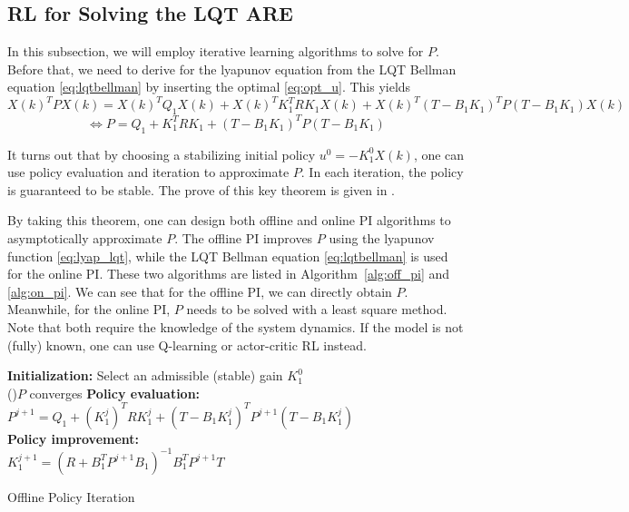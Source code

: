 \subsection{\ac{RL} for Solving the LQT ARE}
In this subsection, we will employ iterative learning algorithms to solve for $P$. Before that, we need to derive for the lyapunov equation from the LQT Bellman equation \eqref{eq:lqtbellman} by inserting the optimal \eqref{eq:opt_u}. This yields
\begin{equation*}
X(k)^TPX(k) =  X(k)^TQ_1X(k) + X(k)^TK_1^TRK_1X(k) + X(k)^T(T - B_1K_1)^TP(T - B_1K_1)X(k)
\end{equation*}
\begin{equation}
\label{eq:lyap_lqt}
\Leftrightarrow  P =  Q_1 + K_1^TRK_1 + (T - B_1K_1)^TP(T - B_1K_1)
\end{equation}

It turns out that by choosing a stabilizing initial policy $u^0 = -K_1^0X(k)$, one can use policy evaluation and iteration to approximate $ P $. In each iteration, the policy is guaranteed to be stable. The prove of this key theorem is given in \cite{1099755}. 

By taking this theorem, one can design both offline and online \ac{PI} algorithms to asymptotically approximate $P$. The offline \ac{PI} improves $P$ using the lyapunov function \eqref{eq:lyap_lqt}, while the LQT Bellman equation \eqref{eq:lqtbellman} is used for the online \ac{PI}. These two algorithms are listed in Algorithm~\ref{alg:off_pi} and \ref{alg:on_pi}. We can see that for the offline \ac{PI}, we can directly obtain $P$. Meanwhile, for the online \ac{PI}, $P$ needs to be solved with a least square method. Note that both require the knowledge of the system dynamics. If the model is not (fully) known, one can use Q-learning \cite{Kiumarsi20141167} or actor-critic \ac {RL} \cite{Modares20141780} instead. 

\begin{algorithm}[H]
	\textbf{Initialization:} Select an admissible (stable) gain $K^0_1$\\
	\Repeat(){$ P $ converges}{
		\textbf{Policy evaluation:} \\
		$P^{j+1} = Q_1 + (K_1^j)^TRK_1^j + (T-B_1K_1^j)^TP^{j+1}(T-B_1K_1^j)$\\
		
		\textbf{Policy improvement:} \\
		$ K_1^{j+1} = (R+B_1^TP^{j+1}B_1)^{-1} B_1^TP^{j+1}T $\\	
	}
	\label{alg:off_pi}
	\caption{Offline Policy Iteration}
\end{algorithm}

